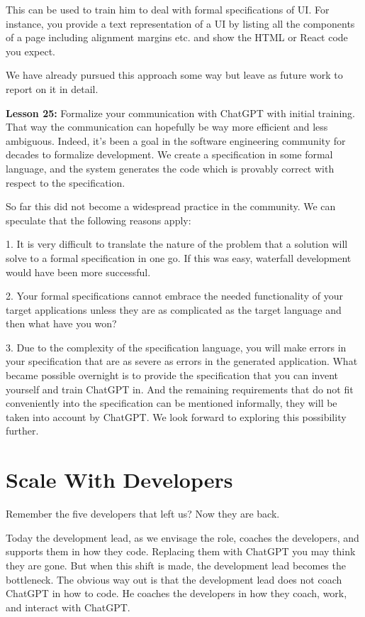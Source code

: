 \documentclass[runningheads]{llncs}
\begin{document}
This can be used to train him to deal with formal specifications of UI. For instance, you provide a text representation of a UI by listing all the components of a page including alignment margins etc. and show the HTML or React code you expect.

We have already pursued this approach some way but leave as future work to report on it in detail.

\textbf{Lesson 25:} Formalize your communication with ChatGPT with initial training. That way the communication can hopefully be way more efficient and less ambiguous.
Indeed, it's been a goal in the software engineering community for decades to formalize development. We create a specification in some formal language, and the system generates the code which is provably correct with respect to the specification.

So far this did not become a widespread practice in the community. We can speculate that the following reasons apply:

1. It is very difficult to translate the nature of the problem that a solution will solve to a formal specification in one go. If this was easy, waterfall development would have been more successful.

2. Your formal specifications cannot embrace the needed functionality of your target applications unless they are as complicated as the target language and then what have you won?

3. Due to the complexity of the specification language, you will make errors in your specification that are as severe as errors in the generated application.
What became possible overnight is to provide the specification that you can invent yourself and train ChatGPT in. And the remaining requirements that do not fit conveniently into the specification can be mentioned informally, they will be taken into account by ChatGPT. We look forward to exploring this possibility further.
  
\section{Scale With Developers}
Remember the five developers that left us? Now they are back.

Today the development lead, as we envisage the role, coaches the developers, and supports them in how they code. Replacing them with ChatGPT you may think they are gone.
But when this shift is made, the development lead becomes the bottleneck. The obvious way out is that the development lead does not coach ChatGPT in how to code. He 
coaches the developers in how they coach, work, and interact with ChatGPT.
\end{document}

